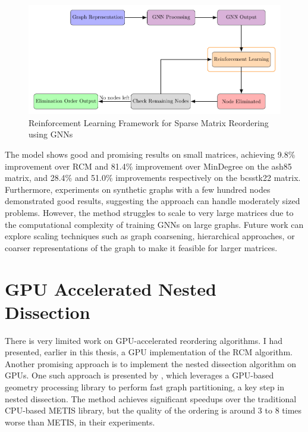 \begin{figure}[h]
    \centering
    \includegraphics[width=\textwidth]{fig/other/diagram.pdf}
    \caption{Reinforcement Learning Framework for Sparse Matrix Reordering using GNNs}
    \label{fig:rl_method}
\end{figure}

The model shows good and promising results on small matrices, achieving 9.8\% improvement over RCM and 81.4\% improvement over MinDegree on the ash85 matrix, and 28.4\% and 51.0\% improvements respectively on the bcsstk22 matrix. Furthermore, experiments on synthetic graphs with a few hundred nodes demonstrated good results, suggesting the approach can handle moderately sized problems. However, the method struggles to scale to very large matrices due to the computational complexity of training GNNs on large graphs. Future work can explore scaling techniques such as graph coarsening, hierarchical approaches, or coarser representations of the graph to make it feasible for larger matrices.

\section{GPU Accelerated Nested Dissection}

There is very limited work on GPU-accelerated reordering algorithms. I had presented, earlier in this thesis, a GPU implementation of the RCM algorithm. Another promising approach is to implement the nested dissection algorithm on GPUs. One such approach is presented by \cite{yuan_fast_nodate}, which leverages a GPU-based geometry processing library to perform fast graph partitioning, a key step in nested dissection. The method achieves significant speedups over the traditional CPU-based METIS library, but the quality of the ordering is around 3 to 8 times worse than METIS, in their experiments.

